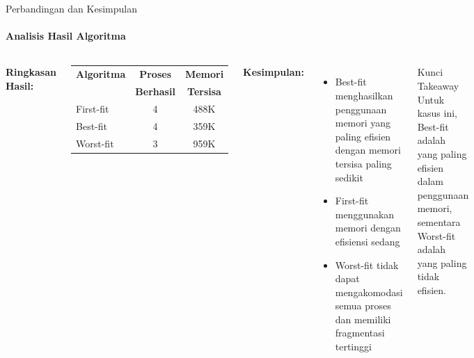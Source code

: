 \documentclass[10pt,aspectratio=169]{beamer}
\begin{document}
\begin{frame}{Perbandingan dan Kesimpulan}
    \framesubtitle{Analisis Hasil Algoritma}
    
    \begin{columns}[T]
            \textbf{Ringkasan Hasil:}
                
                \begin{center}
                    \begin{tabular}{|l|c|c|}
                      \hline
                      \textbf{Algoritma} & \textbf{Proses} & \textbf{Memori} \\
                      & \textbf{Berhasil} & \textbf{Tersisa} \\
                      \hline
                      First-fit & 4 & 488K \\
                      \hline
                      Best-fit & 4 & 359K \\
                      \hline
                      Worst-fit & 3 & 959K \\
                      \hline
                    \end{tabular}
                \end{center}
            
            \textbf{Kesimpulan:}
            \begin{itemize}
                \item Best-fit menghasilkan penggunaan memori yang paling efisien dengan memori tersisa paling sedikit
                \item First-fit menggunakan memori dengan efisiensi sedang
                \item Worst-fit tidak dapat mengakomodasi semua proses dan memiliki fragmentasi tertinggi
            \end{itemize}
            
            \begin{alertblock}{Kunci Takeaway}
                Untuk kasus ini, Best-fit adalah yang paling efisien dalam penggunaan memori, sementara Worst-fit adalah yang paling tidak efisien.
            \end{alertblock}
    \end{columns}
\end{frame}
\end{document}
